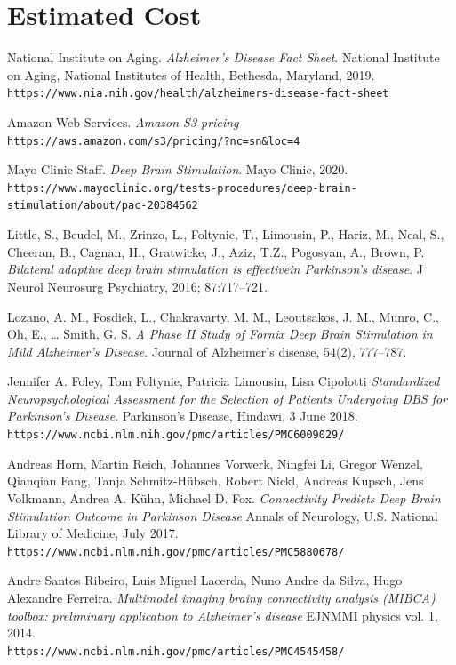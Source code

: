 \documentclass{article}
\begin{document}
\section{Estimated Cost}



\begin{thebibliography}{9}

National Institute on Aging. 
\textit{Alzheimer's Disease Fact Sheet}. 
National Institute on Aging, National Institutes of Health, Bethesda, Maryland, 2019.
\\\texttt{https://www.nia.nih.gov/health/alzheimers-disease-fact-sheet}

Amazon Web Services.
\textit{Amazon S3 pricing}
\\\texttt{https://aws.amazon.com/s3/pricing/?nc=sn\&loc=4}

Mayo Clinic Staff. 
\textit{Deep Brain Stimulation}. 
Mayo Clinic, 2020.
\\\texttt{https://www.mayoclinic.org/tests-procedures/deep-brain-stimulation/about/pac-20384562}

Little, S., Beudel, M., Zrinzo, L., Foltynie, T., Limousin, P., Hariz, M., Neal, S., Cheeran, B., Cagnan, H., Gratwicke, J., Aziz, T.Z., Pogosyan, A., Brown, P. 
\textit{Bilateral adaptive deep brain stimulation is effectivein Parkinson’s disease}. 
J Neurol Neurosurg Psychiatry, 2016; 87:717–721.

Lozano, A. M., Fosdick, L., Chakravarty, M. M., Leoutsakos, J. M., Munro, C., Oh, E., … Smith, G. S. 
\textit{A Phase II Study of Fornix Deep Brain Stimulation in Mild Alzheimer’s Disease}. 
Journal of Alzheimer's disease, 54(2), 777–787. 

Jennifer A. Foley, Tom Foltynie, Patricia Limousin, Lisa Cipolotti
\textit{Standardized Neuropsychological Assessment for the Selection of Patients Undergoing DBS for Parkinson's Disease}.
Parkinson's Disease, Hindawi, 3 June 2018.
\\\texttt{https://www.ncbi.nlm.nih.gov/pmc/articles/PMC6009029/}

Andreas Horn, Martin Reich, Johannes Vorwerk, Ningfei Li, Gregor Wenzel, Qianqian Fang, Tanja Schmitz-Hübsch, Robert Nickl, Andreas Kupsch, Jens Volkmann, Andrea A. Kühn, Michael D. Fox.
\textit{Connectivity Predicts Deep Brain Stimulation Outcome in Parkinson Disease}
Annals of Neurology, U.S. National Library of Medicine, July 2017.
\\\texttt{https://www.ncbi.nlm.nih.gov/pmc/articles/PMC5880678/}

Andre Santos Ribeiro, Luis Miguel Lacerda, Nuno Andre da Silva, Hugo Alexandre Ferreira.
\textit{Multimodel imaging brainy connectivity analysis (MIBCA) toolbox: preliminary application to Alzheimer's disease}
EJNMMI physics vol. 1, 2014.
\\\texttt{https://www.ncbi.nlm.nih.gov/pmc/articles/PMC4545458/}

\end{thebibliography}
\end{document}
